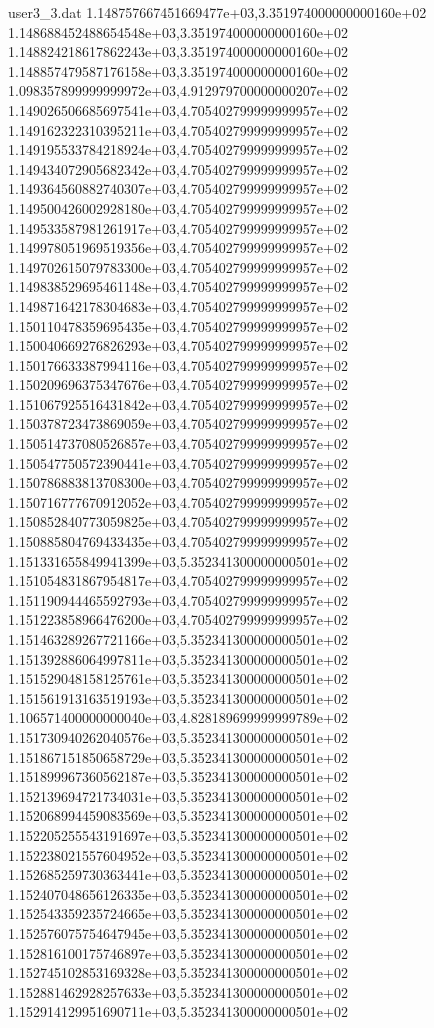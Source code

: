 \begin{filecontents}{user3_3.dat}
1.148757667451669477e+03,3.351974000000000160e+02
1.148688452488654548e+03,3.351974000000000160e+02
1.148824218617862243e+03,3.351974000000000160e+02
1.148857479587176158e+03,3.351974000000000160e+02
1.098357899999999972e+03,4.912979700000000207e+02
1.149026506685697541e+03,4.705402799999999957e+02
1.149162322310395211e+03,4.705402799999999957e+02
1.149195533784218924e+03,4.705402799999999957e+02
1.149434072905682342e+03,4.705402799999999957e+02
1.149364560882740307e+03,4.705402799999999957e+02
1.149500426002928180e+03,4.705402799999999957e+02
1.149533587981261917e+03,4.705402799999999957e+02
1.149978051969519356e+03,4.705402799999999957e+02
1.149702615079783300e+03,4.705402799999999957e+02
1.149838529695461148e+03,4.705402799999999957e+02
1.149871642178304683e+03,4.705402799999999957e+02
1.150110478359695435e+03,4.705402799999999957e+02
1.150040669276826293e+03,4.705402799999999957e+02
1.150176633387994116e+03,4.705402799999999957e+02
1.150209696375347676e+03,4.705402799999999957e+02
1.151067925516431842e+03,4.705402799999999957e+02
1.150378723473869059e+03,4.705402799999999957e+02
1.150514737080526857e+03,4.705402799999999957e+02
1.150547750572390441e+03,4.705402799999999957e+02
1.150786883813708300e+03,4.705402799999999957e+02
1.150716777670912052e+03,4.705402799999999957e+02
1.150852840773059825e+03,4.705402799999999957e+02
1.150885804769433435e+03,4.705402799999999957e+02
1.151331655849941399e+03,5.352341300000000501e+02
1.151054831867954817e+03,4.705402799999999957e+02
1.151190944465592793e+03,4.705402799999999957e+02
1.151223858966476200e+03,4.705402799999999957e+02
1.151463289267721166e+03,5.352341300000000501e+02
1.151392886064997811e+03,5.352341300000000501e+02
1.151529048158125761e+03,5.352341300000000501e+02
1.151561913163519193e+03,5.352341300000000501e+02
1.106571400000000040e+03,4.828189699999999789e+02
1.151730940262040576e+03,5.352341300000000501e+02
1.151867151850658729e+03,5.352341300000000501e+02
1.151899967360562187e+03,5.352341300000000501e+02
1.152139694721734031e+03,5.352341300000000501e+02
1.152068994459083569e+03,5.352341300000000501e+02
1.152205255543191697e+03,5.352341300000000501e+02
1.152238021557604952e+03,5.352341300000000501e+02
1.152685259730363441e+03,5.352341300000000501e+02
1.152407048656126335e+03,5.352341300000000501e+02
1.152543359235724665e+03,5.352341300000000501e+02
1.152576075754647945e+03,5.352341300000000501e+02
1.152816100175746897e+03,5.352341300000000501e+02
1.152745102853169328e+03,5.352341300000000501e+02
1.152881462928257633e+03,5.352341300000000501e+02
1.152914129951690711e+03,5.352341300000000501e+02

\end{filecontents}
